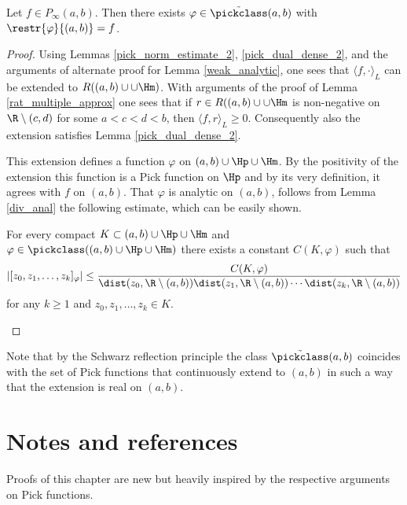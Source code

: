 \begin{lem}\label{loewner_hard}
	Let $f \in P_{\infty}(a, b)$. Then there exists $\varphi \in \tilde{\pickclass}(a, b)$ with $\restr{\varphi}{(a, b)} = f$.
\end{lem}
\begin{proof}
	Using Lemmas \ref{pick_norm_estimate_2}, \ref{pick_dual_dense_2}, and the arguments of alternate proof for Lemma \ref{weak_analytic}, one sees that $\langle f, \cdot\rangle_{L}$ can be extended to $R((a, b) \cup \cup \Hm)$. With arguments of the proof of Lemma \ref{rat_multiple_approx} one sees that if $r \in R((a, b) \cup \cup \Hm$ is non-negative on $\R \setminus (c, d)$ for some $a < c < d < b$, then $\langle f, r \rangle_{L} \geq 0$. Consequently also the extension satisfies Lemma \ref{pick_dual_dense_2}.

	This extension defines a function $\varphi$ on $(a, b) \cup \Hp \cup \Hm$. By the positivity of the extension this function is a Pick function on $\Hp$ and by its very definition, it agrees with $f$ on $(a, b)$. That $\varphi$ is analytic on $(a, b)$, follows from Lemma \ref{div_anal} the following estimate, which can be easily shown.
	\begin{lem}\label{pick_div_dif_estimate_2}
		For every compact $K \subset (a, b) \cup \Hp \cup \Hm$ and $\varphi \in \pickclass((a, b) \cup \Hp \cup \Hm)$ there exists a constant $C(K, \varphi)$ such that
		\begin{align*}
			\left|[z_{0}, z_{1}, \ldots, z_{k}]_{\varphi}\right| \leq \frac{C(K, \varphi)}{\dist(z_{0}, \R \setminus (a, b)) \dist(z_{1}, \R \setminus (a, b)) \cdots \dist(z_{k}, \R \setminus (a, b))}
		\end{align*}
		for any $k \geq 1$ and $z_{0}, z_{1}, \ldots, z_{k} \in K$.
	\end{lem}
\end{proof}

Note that by the Schwarz reflection principle the class $\tilde{\pickclass}(a, b)$ coincides with the set of Pick functions that continuously extend to $(a, b)$ in such a way that the extension is real on $(a, b)$.

\section{Notes and references}

Proofs of this chapter are new but heavily inspired by the respective arguments on Pick functions.

